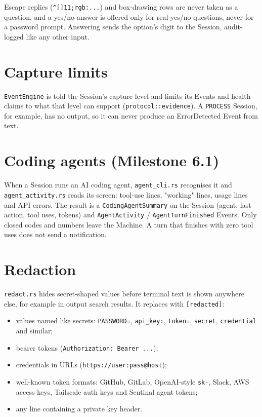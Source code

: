 Escape replies (\texttt{\textasciicircum{}[]11;rgb:...}) and box-drawing rows are never taken as a question, and a yes/no answer is offered only for real yes/no questions, never for a password prompt. Answering sends the option's digit to the Session, audit-logged like any other input.


\section{\texorpdfstring{Capture limits}{Capture limits}}

\texttt{EventEngine} is told the Session's capture level and limits its Events and health claims to what that level can support (\texttt{protocol:\allowbreak{}:\allowbreak{}evidence}). A \texttt{PROCESS} Session, for example, has no output, so it can never produce an ErrorDetected Event from text.

\section{\texorpdfstring{Coding agents (Milestone 6.1)}{Coding agents (Milestone 6.1)}}

When a Session runs an AI coding agent, \texttt{agent\_\allowbreak{}cli.\allowbreak{}rs} recognises it and \texttt{agent\_\allowbreak{}activity.\allowbreak{}rs} reads its screen: tool-use lines, "working" lines, usage lines and API errors. The result is a \texttt{CodingAgentSummary} on the Session (agent, last action, tool uses, tokens) and \texttt{AgentActivity} / \texttt{AgentTurnFinished} Events. Only closed codes and numbers leave the Machine. A turn that finishes with zero tool uses does not send a notification.

\section{\texorpdfstring{Redaction}{Redaction}}

\texttt{redact.\allowbreak{}rs} hides secret-shaped values before terminal text is shown anywhere else, for example in output search results. It replaces with \texttt{[redacted]}:

\begin{itemize}
\item values named like secrets: \texttt{PASSWORD=\allowbreak{}}, \texttt{api\_\allowbreak{}key:\allowbreak{}}, \texttt{token=\allowbreak{}}, \texttt{secret}, \texttt{credential} and similar;
\item bearer tokens (\texttt{Authorization:\allowbreak{}\ Bearer\ .\allowbreak{}.\allowbreak{}.\allowbreak{}});
\item credentials in URLs (\texttt{https:\allowbreak{}/\allowbreak{}/\allowbreak{}user:\allowbreak{}pass@host});
\item well-known token formats: GitHub, GitLab, OpenAI-style \texttt{sk-{}\allowbreak{}}, Slack, AWS access keys, Tailscale auth keys and Sentinal agent tokens;
\item any line containing a private key header.
\end{itemize}

